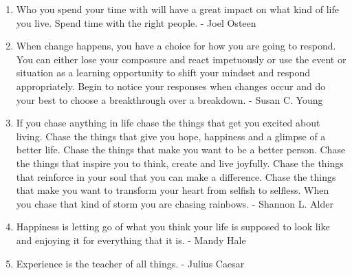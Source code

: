 \begin{enumerate}
            \item Who you spend your time with will have a great impact on what kind of life you live. Spend time with the right people. - Joel Osteen

            \item When change happens, you have a choice for how you are going to respond. You can either lose your composure and react impetuously or use the event or situation as a learning opportunity to shift your mindset and respond appropriately. Begin to notice your responses when changes occur and do your best to choose a breakthrough over a breakdown. - Susan C. Young

            \item If you chase anything in life chase the things that get you excited about living. Chase the things that give you hope, happiness and a glimpse of a better life. Chase the things that make you want to be a better person. Chase the things that inspire you to think, create and live joyfully. Chase the things that reinforce in your soul that you can make a difference. Chase the things that make you want to transform your heart from selfish to selfless. When you chase that kind of storm you are chasing rainbows. - Shannon L. Alder

            \item Happiness is letting go of what you think your life is supposed to look like and enjoying it for everything that it is. - Mandy Hale

            \item Experience is the teacher of all things. - Julius Caesar

        \end{enumerate}

